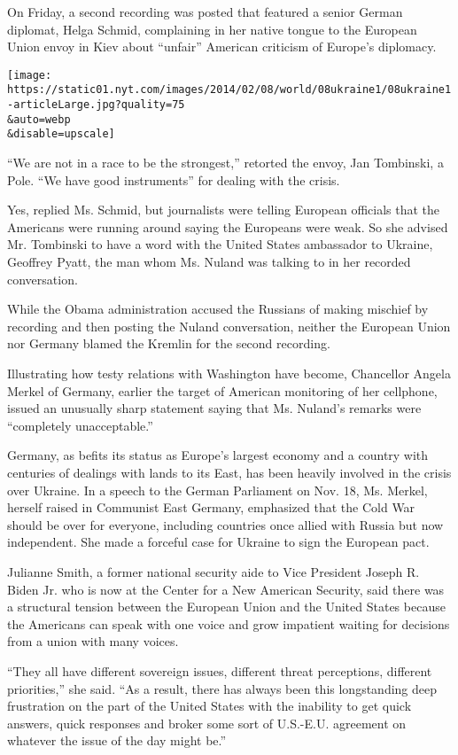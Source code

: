 On Friday, a second recording was posted that featured a senior German
diplomat, Helga Schmid, complaining in her native tongue to the European
Union envoy in Kiev about ``unfair'' American criticism of Europe's
diplomacy.

\texttt{[image: https://static01.nyt.com/images/2014/02/08/world/08ukraine1/08ukraine1-articleLarge.jpg?quality=75\\\&auto=webp\\\&disable=upscale]}

``We are not in a race to be the strongest,'' retorted the envoy, Jan
Tombinski, a Pole. ``We have good instruments'' for dealing with the
crisis.

Yes, replied Ms. Schmid, but journalists were telling European officials
that the Americans were running around saying the Europeans were weak.
So she advised Mr. Tombinski to have a word with the United States
ambassador to Ukraine, Geoffrey Pyatt, the man whom Ms. Nuland was
talking to in her recorded conversation.

While the Obama administration accused the Russians of making mischief
by recording and then posting the Nuland conversation, neither the
European Union nor Germany blamed the Kremlin for the second recording.

Illustrating how testy relations with Washington have become, Chancellor
Angela Merkel of Germany, earlier the target of American monitoring of
her cellphone, issued an unusually sharp statement saying that Ms.
Nuland's remarks were ``completely unacceptable.''

Germany, as befits its status as Europe's largest economy and a country
with centuries of dealings with lands to its East, has been heavily
involved in the crisis over Ukraine. In a speech to the German
Parliament on Nov. 18, Ms. Merkel, herself raised in Communist East
Germany, emphasized that the Cold War should be over for everyone,
including countries once allied with Russia but now independent. She
made a forceful case for Ukraine to sign the European pact.

Julianne Smith, a former national security aide to Vice President Joseph
R. Biden Jr. who is now at the Center for a New American Security, said
there was a structural tension between the European Union and the United
States because the Americans can speak with one voice and grow impatient
waiting for decisions from a union with many voices.

``They all have different sovereign issues, different threat
perceptions, different priorities,'' she said. ``As a result, there has
always been this longstanding deep frustration on the part of the United
States with the inability to get quick answers, quick responses and
broker some sort of U.S.-E.U. agreement on whatever the issue of the day
might be.''

